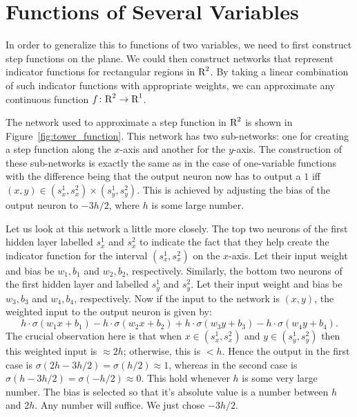 \section{Functions of Several Variables}

In order to generalize this to functions of two variables, we need to first 
construct step functions on the plane. We could then construct networks 
that represent indicator functions for rectangular regions in $\text{R}^2$. By taking a 
linear combination of such indicator functions with appropriate weights, we can 
approximate any continuous function $f \colon \text{R}^2 \to \text{R}^1$. 

The network used to approximate a step function in $\text{R}^2$ is shown in 
Figure~\ref{fig:tower_function}. This network has two sub-networks: one 
for creating a step function along the $x$-axis and another for the $y$-axis. 
The construction of these sub-networks is exactly the same as in the case of 
one-variable functions with the difference being that the output neuron now has to 
output a $1$ iff $(x, y) \in (s_x^1, s_x^2) \times (s_y^1, s_y^2)$. This is achieved 
by adjusting the bias of the output neuron to $- 3h/2$, where $h$ is some large number.
  
Let us look at this network a little more closely. 
The top two neurons of the first hidden layer labelled $s_x^1$ and $s_x^2$ to indicate 
the fact that they help create the indicator function for the interval $(s_x^1, s_x^2)$ 
on the $x$-axis. Let their input weight and bias be $w_1, b_1$ and $w_2, b_2$, respectively. 
Similarly, the bottom two neurons of the first hidden layer and labelled $s_y^1$ and $s_y^2$.
Let their input weight and bias be $w_3, b_3$ and $w_4, b_4$, respectively. Now if the input 
to the network is $(x, y)$, the weighted input to the output neuron is given by:
\[
    h \cdot \sigma (w_1 x + b_1) - h \cdot \sigma (w_2 x + b_2) + h \cdot \sigma (w_3 y + b_3) 
    -h \cdot \sigma (w_4 y + b_4).
\]
The crucial observation here is that when $x \in (s_x^1, s_x^2)$ and $y \in (s_y^1, s_y^2)$ 
then this weighted input is $\approx 2h$; otherwise, this is $< h$. Hence the output in the 
first case is $\sigma (2h - 3h/2) = \sigma (h / 2) \approx 1$, whereas in the second case
is $\sigma (h - 3h/2) = \sigma (-h/2) \approx 0$. This hold whenever $h$ is some very large number.
The bias is selected so that it's absolute value is a number between $h$ and $2h$. Any number will 
suffice. We just chose $-3h/2$.


